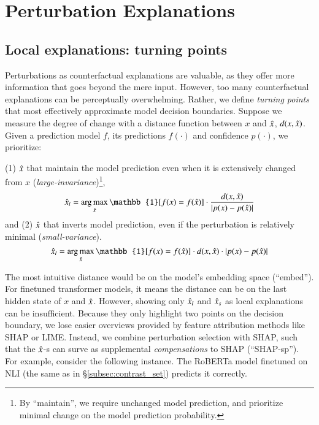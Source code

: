 
\newcommand{\fwone}[1]{\colbox{cfwone}{#1}\xspace}
\newcommand{\fwtwo}[1]{\colbox{cfwtwo}{#1}\xspace}
\newcommand{\fwthree}[1]{\colbox{cfwthree}{#1}\xspace}
\newcommand{\fwfour}[1]{\colbox{cfwfour}{#1}\xspace}

\newcommand{\fexp}[2]{\texttt{[{\color{darkgray}{#1:#2}}]}\xspace}
\newcommand{\fexptag}[1]{\fexp{TAG}{#1}}
\newcommand{\fexpfrom}[1]{\fexp{FROM}{#1}}
\newcommand{\fexpto}[1]{\fexp{TO}{#1}}
\newcommand{\fexptemp}[1]{\fexp{TEMP}{#1}}


\section{Perturbation Explanations}


\subsection{Local explanations: turning points}

Perturbations as counterfactual explanations are valuable, as they offer more information that goes beyond the mere input.
However, too many counterfactual explanations can be perceptually overwhelming.
Rather, we define \emph{turning points} that most effectively approximate model decision boundaries. 
Suppose we measure the degree of change with a distance function between $x$ and $\hat{x}$, $d(x,\hat{x})$. 
Given a prediction model $f$, its predictions $f(\cdot)$ and confidence $p(\cdot)$, we prioritize: 

(1) $\hat{x}$ that maintain the model prediction even when it is extensively changed from $x$ (\emph{large-invariance})\footnote{By ``maintain'', we require unchanged model prediction, and prioritize minimal change on the model prediction probability.}, 
%
$$\xp_l = \argmax_{\xp} \mathbb{1}[f(x) = f(\xp)] \cdot \frac{d(x,\xp)}{|p(x) - p(\xp)|} $$
\noindent and (2) $\hat{x}$ that inverts model prediction, even if the perturbation is relatively minimal (\emph{small-variance}).
$$\xp_l = \argmax_{\xp} \mathbb{1}[f(x) = f(\xp)] \cdot {d(x,\xp)} \cdot {|p(x) - p(\xp)|} $$

The most intuitive distance would be on the model's embedding space (``embed'').
For finetuned transformer models, it means the distance can be on the last hidden state of $x$ and $\hat{x}$.
However, showing only $\hat{x}_l$ and $\hat{x}_s$ as local explanations can be insufficient. 
Because they only highlight two points on the decision boundary, we lose easier overviews provided by feature attribution methods like SHAP or LIME.
Instead, we combine perturbation selection with SHAP, such that the $\hat{x}$-s can surve as supplemental \emph{compensations} to SHAP (``SHAP-sp'').
For example, consider the following \dnli instance. 
The RoBERTa model finetuned on NLI (the same as in \S\ref{subsec:contrast_set}) predicts it correctly.

